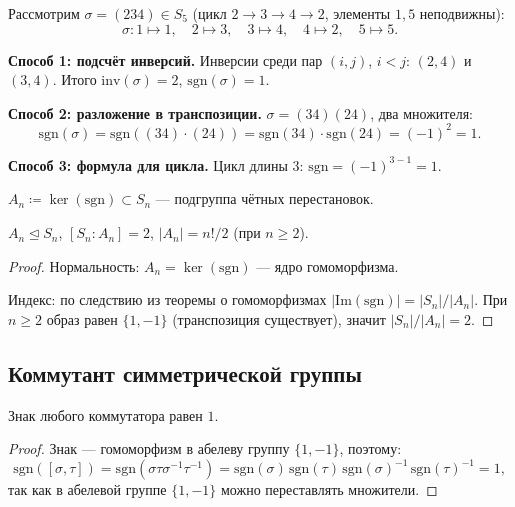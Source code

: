 \begin{example}
    Рассмотрим $\sigma = (234) \in S_5$ (цикл $2\to3\to4\to2$, элементы $1,5$ неподвижны):
    \[
        \sigma\colon 1\mapsto 1,\quad 2\mapsto 3,\quad 3\mapsto 4,\quad 4\mapsto 2,\quad 5\mapsto 5.
    \]
 
    \textbf{Способ 1: подсчёт инверсий.}
    Инверсии среди пар $(i,j)$, $i < j$: $(2,4)$ и $(3,4)$. Итого $\mathrm{inv}(\sigma) = 2$, $\mathrm{sgn}(\sigma) = 1$.
 
    \textbf{Способ 2: разложение в транспозиции.}
    $\sigma = (34)(24)$, два множителя:
    \[
        \mathrm{sgn}(\sigma) = \mathrm{sgn}((34) \cdot (24)) = \mathrm{sgn}(34)\cdot\mathrm{sgn}(24) = (-1)^2 = 1.
    \]
 
    \textbf{Способ 3: формула для цикла.}
    Цикл длины $3$: $\mathrm{sgn} = (-1)^{3-1} = 1$.
\end{example}
 

 
\begin{definition}
    $A_n \coloneqq \ker(\mathrm{sgn}) \subset S_n$ --- подгруппа чётных перестановок.
\end{definition}
 
\begin{stmt}
    $A_n \trianglelefteq S_n$, $[S_n : A_n] = 2$, $|A_n| = n!/2$ (при $n \geq 2$).
    \begin{proof}
        Нормальность: $A_n = \ker(\mathrm{sgn})$ --- ядро гомоморфизма.
 
        Индекс: по следствию из теоремы о гомоморфизмах $|\mathrm{Im}(\mathrm{sgn})| = |S_n|/|A_n|$.
        При $n \geq 2$ образ равен $\{1,-1\}$ (транспозиция существует), значит $|S_n|/|A_n| = 2$.
    \end{proof}
\end{stmt}
 

\subsection*{Коммутант симметрической группы}
 
\begin{lemma}
    Знак любого коммутатора равен $1$.
 
    \begin{proof}
        Знак --- гомоморфизм в абелеву группу $\{1,-1\}$, поэтому:
        \[
            \mathrm{sgn}([\sigma,\tau])
            = \mathrm{sgn}(\sigma\tau\sigma^{-1}\tau^{-1})
            = \mathrm{sgn}(\sigma)\,\mathrm{sgn}(\tau)\,\mathrm{sgn}(\sigma)^{-1}\,\mathrm{sgn}(\tau)^{-1}
            = 1,
        \]
        так как в абелевой группе $\{1,-1\}$ можно переставлять множители.
    \end{proof}
\end{lemma}
 

